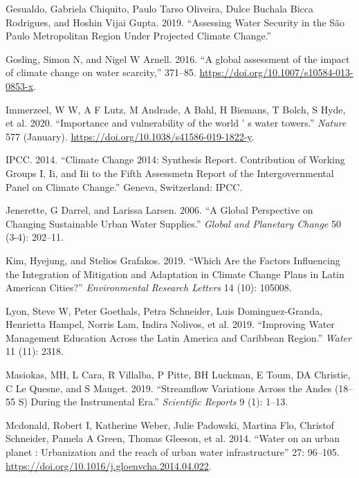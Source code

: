 \documentclass[]{article}
\begin{document}
\leavevmode\hypertarget{ref-Gesualdo2019}{}%
Gesualdo, Gabriela Chiquito, Paulo Tarso Oliveira, Dulce Buchala Bicca
Rodrigues, and Hoshin Vijai Gupta. 2019. ``Assessing Water Security in
the São Paulo Metropolitan Region Under Projected Climate Change.''

\leavevmode\hypertarget{ref-Gosling2016}{}%
Gosling, Simon N, and Nigel W Arnell. 2016. ``A global assessment of the
impact of climate change on water scarcity,'' 371--85.
\url{https://doi.org/10.1007/s10584-013-0853-x}.

\leavevmode\hypertarget{ref-Immerzeel2019}{}%
Immerzeel, W W, A F Lutz, M Andrade, A Bahl, H Biemans, T Bolch, S Hyde,
et al. 2020. ``Importance and vulnerability of the world ' s water
towers.'' \emph{Nature} 577 (January).
\url{https://doi.org/10.1038/s41586-019-1822-y}.

\leavevmode\hypertarget{ref-IPCC2014}{}%
IPCC. 2014. ``Climate Change 2014: Synthesis Report. Contribution of
Working Groups I, Ii, and Iii to the Fifth Assessmetn Report of the
Intergovernmental Panel on Climate Change.'' Geneva, Switzerland: IPCC.

\leavevmode\hypertarget{ref-Jenerette2006}{}%
Jenerette, G Darrel, and Larissa Larsen. 2006. ``A Global Perspective on
Changing Sustainable Urban Water Supplies.'' \emph{Global and Planetary
Change} 50 (3-4): 202--11.

\leavevmode\hypertarget{ref-Kim2019}{}%
Kim, Hyejung, and Stelios Grafakos. 2019. ``Which Are the Factors
Influencing the Integration of Mitigation and Adaptation in Climate
Change Plans in Latin American Cities?'' \emph{Environmental Research
Letters} 14 (10): 105008.

\leavevmode\hypertarget{ref-Lyon2019}{}%
Lyon, Steve W, Peter Goethals, Petra Schneider, Luis Dominguez-Granda,
Henrietta Hampel, Norris Lam, Indira Nolivos, et al. 2019. ``Improving
Water Management Education Across the Latin America and Caribbean
Region.'' \emph{Water} 11 (11): 2318.

\leavevmode\hypertarget{ref-Masiokas2019}{}%
Masiokas, MH, L Cara, R Villalba, P Pitte, BH Luckman, E Toum, DA
Christie, C Le Quesne, and S Mauget. 2019. ``Streamflow Variations
Across the Andes (18--55 S) During the Instrumental Era.''
\emph{Scientific Reports} 9 (1): 1--13.

\leavevmode\hypertarget{ref-Mcdonald2014}{}%
Mcdonald, Robert I, Katherine Weber, Julie Padowski, Martina Flo,
Christof Schneider, Pamela A Green, Thomas Gleeson, et al. 2014. ``Water
on an urban planet : Urbanization and the reach of urban water
infrastructure'' 27: 96--105.
\url{https://doi.org/10.1016/j.gloenvcha.2014.04.022}.
\end{document}
